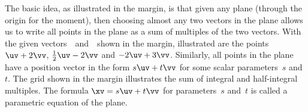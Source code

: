 The basic idea, as illustrated in the margin, is that given any plane (through the origin for the moment), then choosing almost any two vectors in the plane allows us to write all points in the plane as a sum of multiples of the two vectors.
With the given vectors~\uv\ and~\vv\ shown in the margin, illustrated are the points \(\uv+2\vv\), \(\tfrac12\uv-2\vv\) and \(-2\uv+3\vv\).
%
Similarly, all points in the plane have a position vector in the form \(s\uv+t\vv\) for some scalar parameters~\(s\) and~\(t\).
The grid shown in the margin illustrates the sum of integral and half-integral multiples.
The formula \(\xv=s\uv+t\vv\) for parameters~\(s\) and~\(t\) is called a parametric equation of the plane.




